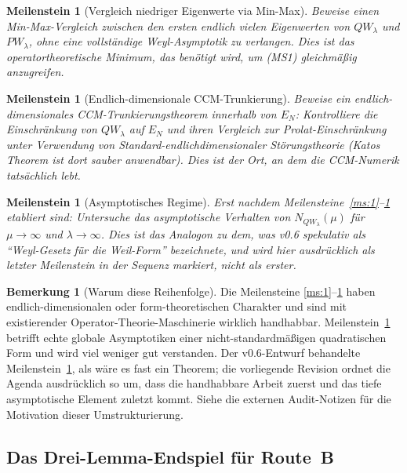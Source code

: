 \documentclass[11pt,a4paper]{article}
\theoremstyle{plain}
\newtheorem{milestone}[theorem]{Meilenstein}
\theoremstyle{definition}
\newtheorem{remark}[theorem]{Bemerkung}
\begin{document}
\begin{milestone}[Vergleich niedriger Eigenwerte via Min-Max]
\label{ms:2}
Beweise einen Min-Max-Vergleich zwischen den ersten endlich vielen
Eigenwerten von $QW_\lambda$ und $PW_\lambda$, \emph{ohne}
eine vollständige Weyl-Asymptotik zu verlangen. Dies ist das operatortheoretische
Minimum, das benötigt wird, um (MS1) gleichmäßig anzugreifen.
\end{milestone}

\begin{milestone}[Endlich-dimensionale CCM-Trunkierung]
\label{ms:3}
Beweise ein endlich-dimensionales CCM-Trunkierungstheorem innerhalb von $E_N$:
Kontrolliere die Einschränkung von $QW_\lambda$ auf $E_N$ und ihren Vergleich
zur Prolat-Einschränkung unter Verwendung von Standard-endlichdimensionaler
Störungstheorie (Katos Theorem ist dort sauber anwendbar). Dies ist der Ort, an dem
die CCM-Numerik tatsächlich lebt.
\end{milestone}

\begin{milestone}[Asymptotisches Regime]
\label{ms:4}
Erst nachdem Meilensteine~\ref{ms:1}--\ref{ms:3} etabliert sind:
Untersuche das asymptotische Verhalten von $N_{QW_\lambda}(\mu)$ für
$\mu \to \infty$ und $\lambda \to \infty$. Dies ist das Analogon zu
dem, was v0.6 spekulativ als ``Weyl-Gesetz für die Weil-Form'' bezeichnete,
und wird hier ausdrücklich als \emph{letzter} Meilenstein in der Sequenz
markiert, nicht als erster.
\end{milestone}

\begin{remark}[Warum diese Reihenfolge]
\label{rem:milestone-ordering}
Die Meilensteine \ref{ms:1}--\ref{ms:3} haben endlich-dimensionalen oder
form-theoretischen Charakter und sind mit existierender Operator-Theorie-Maschinerie
wirklich handhabbar. Meilenstein~\ref{ms:4} betrifft echte globale Asymptotiken
einer nicht-standardmäßigen quadratischen Form und wird viel weniger
gut verstanden. Der v0.6-Entwurf behandelte Meilenstein~\ref{ms:4}, als
wäre es fast ein Theorem; die vorliegende Revision ordnet die Agenda
ausdrücklich so um, dass die handhabbare Arbeit zuerst und das tiefe asymptotische
Element zuletzt kommt. Siehe die externen Audit-Notizen für die Motivation dieser
Umstrukturierung.
\end{remark}

\subsection{Das Drei-Lemma-Endspiel für Route~B}
\label{sec:three-lemma-endgame}
\end{document}
